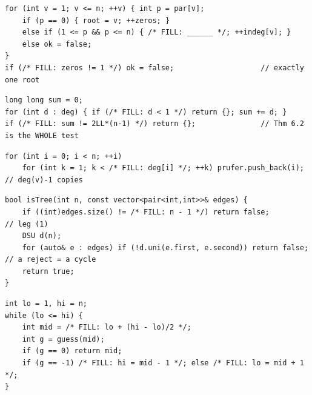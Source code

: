 \begin{lstlisting}[caption={Drill 1 -- rebuild a rooted tree from its parent array (from \coderef{c25-build})}]
for (int v = 1; v <= n; ++v) { int p = par[v];
    if (p == 0) { root = v; ++zeros; }
    else if (1 <= p && p <= n) { /* FILL: ______ */; ++indeg[v]; }
    else ok = false;
}
if (/* FILL: zeros != 1 */) ok = false;                    // exactly one root
\end{lstlisting}

\begin{lstlisting}[caption={Drill 2 -- the degree-sum gate (from \coderef{c25-degbld})}]
long long sum = 0;
for (int d : deg) { if (/* FILL: d < 1 */) return {}; sum += d; }
if (/* FILL: sum != 2LL*(n-1) */) return {};               // Thm 6.2 is the WHOLE test
\end{lstlisting}

\begin{lstlisting}[caption={Drill 3 -- the Pr\"ufer multiset (from \coderef{c25-degbld})}]
for (int i = 0; i < n; ++i)
    for (int k = 1; k < /* FILL: deg[i] */; ++k) prufer.push_back(i);   // deg(v)-1 copies
\end{lstlisting}

\begin{lstlisting}[caption={Drill 4 -- is-it-a-tree by one union-find pass (from \coderef{c25-uf})}]
bool isTree(int n, const vector<pair<int,int>>& edges) {
    if ((int)edges.size() != /* FILL: n - 1 */) return false;         // leg (1)
    DSU d(n);
    for (auto& e : edges) if (!d.uni(e.first, e.second)) return false; // a reject = a cycle
    return true;
}
\end{lstlisting}

\begin{lstlisting}[caption={Drill 5 -- optimal play against the oracle (from \coderef{c25-guess})}]
int lo = 1, hi = n;
while (lo <= hi) {
    int mid = /* FILL: lo + (hi - lo)/2 */;
    int g = guess(mid);
    if (g == 0) return mid;
    if (g == -1) /* FILL: hi = mid - 1 */; else /* FILL: lo = mid + 1 */;
}
\end{lstlisting}

